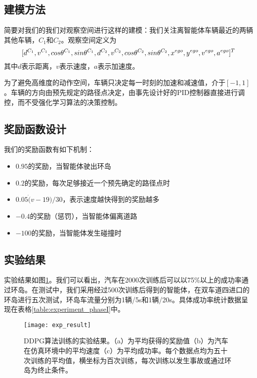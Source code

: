   \subsection{建模方法}
  简要对我们的我们对观察空间进行这样的建模：我们关注离智能体车辆最近的两辆其他车辆，$C_1$和$C_2$。观察空间定义为
  $$[d^{C_1},\space v^{C_1},\space cos\theta^{C_1},\space sin\theta^{C_1},\space d^{C_2},\space v^{C_2},\space cos\theta^{C_2},\space sin\theta^{C_2},\space
  x^{ego},\space y^{ego},\space v^{ego},\space a^{ego}
  ]^T$$
  其中$d$表示距离，$v$表示速度，$a$表示加速度。\par
  为了避免高维度的动作空间，车辆只决定每一时刻的加速和减速值，介于$[-1, 1]$。车辆的方向由预先规定的路径点决定，由事先设计好的PID控制器直接进行调控，而不受强化学习算法的决策控制。
  
  \subsection{奖励函数设计}
  我们的奖励函数有如下机制：
  \begin{itemize}
    \item $0.95$的奖励，当智能体驶出环岛
    \item $0.2$的奖励，每次足够接近一个预先确定的路径点时
    \item $0.05 \dot (v-19)/30 $，表示速度越快得到的奖励越多
    \item $-0.4$的奖励（惩罚），当智能体偏离道路
    \item $-100$的奖励，当智能体发生碰撞时
  \end{itemize}
  
  \subsection{实验结果}
  实验结果如图\ref{fig:experiment_phaseI}。我们可以看出，汽车在2000次训练后可以以75\%以上的成功率通过环岛。在测试中，我们采用经过500次训练后得到的智能体，在双车道四进口的环岛进行五次测试，环岛车流量分别为1辆/5s和1辆/20s。具体成功率统计数据呈现在表格\ref{table:experiment_phaseI}中。\par
  \begin{figure}[h] %
        \centering
        \texttt{[image: exp\_result]}
        \caption{DDPG算法训练的实验结果。（a）为平均获得的奖励值（b）为汽车在仿真环境中的平均速度（c）为平均成功率。每个数据点均为五十次训练的平均值，横坐标为百次训练，每次训练以发生事故或通过环岛为终止条件。}
        \label{fig:experiment_phaseI}
  \end{figure}
  
